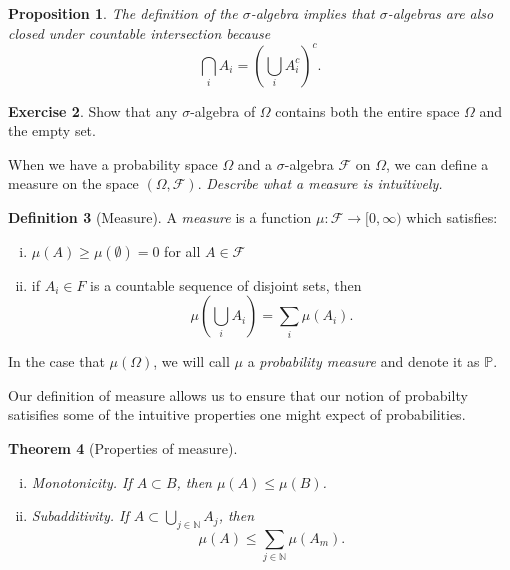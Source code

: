 \documentclass[12pt]{article}
\newcommand{\bbN}{\mathbb{N}}
\newcommand{\calF}{\mathcal{F}}
\newcommand{\Prob}{\mathbb{P}}
\newtheorem{thm}{Theorem}[section]
\newtheorem{prop}[thm]{Proposition}
\theoremstyle{definition}
\newtheorem{defn}[thm]{Definition}
\newtheorem{exer}[thm]{Exercise}
\theoremstyle{remark}
\numberwithin{equation}{section}
\begin{document}
 \begin{prop}
 The definition of the $\sigma$-algebra implies that $\sigma$-algebras are also closed under countable intersection because
 \begin{equation}
   \bigcap_i A_i = \left( \bigcup_i A_i^c \right)^c.
 \end{equation}
 \end{prop}

 \begin{exer}
   Show that any $\sigma$-algebra of $\Omega$ contains both the entire space $\Omega$ and the empty set.
 \end{exer}

 When we have a probability space $\Omega$ and a $\sigma$-algebra $\calF$ on $\Omega$, we can define a measure on the space $(\Omega, \calF)$. \emph{Describe what a measure is intuitively.}

 \begin{defn}[Measure]
   A \emph{measure} is a function $\mu: \calF \to [0, \infty)$ which satisfies:
   \begin{enumerate}[(i)]
     \item $\mu(A) \geq \mu(\emptyset) = 0$ for all $A\in\calF$
     \item if $A_i \in F$ is a countable sequence of disjoint sets, then 
       \begin{equation}
         \mu\left(\bigcup_i A_i \right) = \sum_i \mu(A_i).
       \end{equation}
   \end{enumerate}
   In the case that $\mu(\Omega)$, we will call $\mu$ a \emph{probability measure} and denote it as $\Prob$.
 \end{defn}


 Our definition of measure allows us to ensure that our notion of probabilty satisifies some of the intuitive properties one might expect of probabilities.

 \begin{thm}[Properties of measure]\leavevmode
   \begin{enumerate}[(i)]
     \item \emph{Monotonicity.} If $A\subset B$, then $\mu(A) \leq  \mu(B)$.
   \item \emph{Subadditivity.} If $A\subset \bigcup_{j\in\bbN} A_j$, then 
        \begin{equation}
        \mu(A) \leq \sum_{j\in\bbN} \mu(A_m).
        \end{equation}
 \end{enumerate}
 \end{thm}
\end{document}
